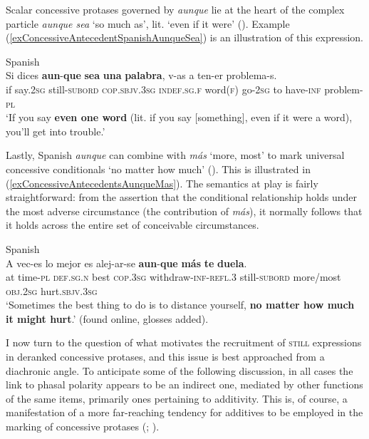 Scalar concessive protases governed by \textit{aunque} lie at the heart of the complex  particle \textit{aunque sea} \lq so much as\rq{}, lit. \lq{}even if it were\rq{ }(). Example (\ref{exConcessiveAntecedentSpanishAunqueSea}) is an illustration of this expression.

\begin{exe}
	\ex Spanish\label{exConcessiveAntecedentSpanishAunqueSea}\\
	\gll Si dices \textbf{aun}-\textbf{que} \textbf{sea} \textbf{una} \textbf{palabra}, v-as a ten-er problema-s.\\
	if say.2\textsc{sg} still-\textsc{subord} \textsc{cop}.\textsc{sbjv}.3\textsc{sg} \textsc{indef}.\textsc{sg}.\textsc{f} word(\textsc{f}) go-2\textsc{sg} to have-\textsc{inf} problem-\textsc{pl}\\
	\glt \lq If you say \textbf{even one word} (lit. if you say [something], even if it were a word), you’ll get into trouble.' \parencite[356]{GastvanderAuwera2011}
\end{exe}

Lastly, Spanish \textit{aunque} can combine with \textit{más} \lq more, most\rq{} to mark universal concessive conditionals \lq no matter how much\rq{ }(). This is illustrated in (\ref{exConcessiveAntecedentsAunqueMas}). The semantics at play is fairly straightforward: from the assertion that the conditional relationship holds under the most adverse circumstance (the contribution of \textit{más}), it normally follows that it holds across the entire set of conceivable circumstances.

\begin{exe}
	\ex Spanish\label{exConcessiveAntecedentsAunqueMas}\\
	\gll A vec-es lo mejor es alej-ar-se \textbf{aun}-\textbf{que} \textbf{más} \textbf{te} \textbf{duela}.\\
at time-\textsc{pl} \textsc{def}.\textsc{sg}.\textsc{n} best \textsc{cop}.3\textsc{sg} withdraw-\textsc{inf}-\textsc{refl}.3 still-\textsc{subord} more/most \textsc{obj}.2\textsc{sg} hurt.\textsc{sbjv}.3\textsc{sg}\\
	\glt \lq Sometimes the best thing to do is to distance yourself, \textbf{no matter how much it might hurt}.\rq{ }(found online, glosses added).
\end{exe}\largerpage[-1]

 I now turn to the question of what motivates the recruitment of \textsc{still} expressions in deranked concessive protases, and this issue is best approached from a diachronic angle. To anticipate some of the following discussion, in all cases the link to phasal polarity appears to be an indirect one, mediated by other functions of the same items, primarily ones pertaining to additivity. This is, of course, a manifestation of a more far-reaching tendency for additives to be employed in the marking of concessive protases (\cite{Forker2016}; \cite{Koenig1985}).

